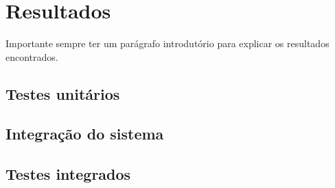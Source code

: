 \chapter{Resultados}
\label{chap:result}
Importante sempre ter um parágrafo introdutório para explicar os resultados encontrados.

\section{Testes unitários}
\label{sec:testu}
\lipsum[1]

\section{Integração do sistema}
\label{sec:intsis}
\lipsum[1]

\section{Testes integrados}
\label{sec:testi}
\lipsum[1]







